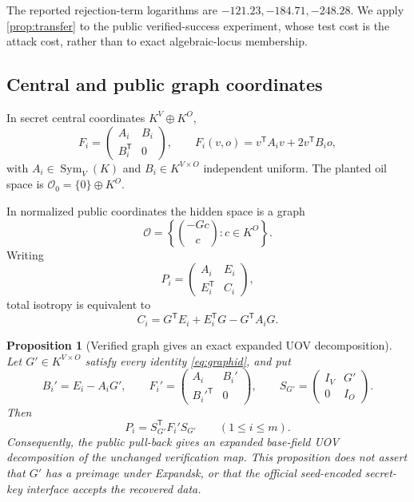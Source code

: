 \documentclass[10pt,a4paper]{article}
\newtheorem{proposition}[theorem]{Proposition}
\newcommand{\cO}{\mathcal O}
\newcommand{\Sym}{\operatorname{Sym}}
\newcommand{\trans}{\mathsf T}
\begin{document}
The reported rejection-term logarithms are $-121.23,-184.71,-248.28$. We apply \cref{prop:transfer} to the public verified-success experiment, whose test cost is the attack cost, rather than to exact algebraic-locus membership.

\subsection{Central and public graph coordinates}

In secret central coordinates $K^V\oplus K^O$,
\begin{equation}\label{eq:central}
F_i=\begin{pmatrix}A_i&B_i\\B_i^{\trans}&0\end{pmatrix},
\qquad F_i(v,o)=v^{\trans}A_iv+2v^{\trans}B_io,
\end{equation}
with $A_i\in\Sym_V(K)$ and $B_i\in K^{V\times O}$ independent uniform. The planted oil space is $\cO_0=\{0\}\oplus K^O$.

In normalized public coordinates the hidden space is a graph
\begin{equation}\label{eq:graph}
\cO=\left\{\binom{-Gc}{c}:c\in K^O\right\}.
\end{equation}
Writing
\[
P_i=\begin{pmatrix}A_i&E_i\\E_i^{\trans}&C_i\end{pmatrix},
\]
total isotropy is equivalent to
\begin{equation}\label{eq:graphid}
C_i=G^{\trans}E_i+E_i^{\trans}G-G^{\trans}A_iG.
\end{equation}

\begin{proposition}[Verified graph gives an exact expanded UOV decomposition]\label{prop:verified-key}
Let $G'\in K^{V\times O}$ satisfy every identity \eqref{eq:graphid}, and put
\[
B_i'=E_i-A_iG',\qquad
F_i'=\begin{pmatrix}A_i&B_i'\\ {B_i'}^{\trans}&0\end{pmatrix},\qquad
S_{G'}=\begin{pmatrix}I_V&G'\\0&I_O\end{pmatrix}.
\]
Then
\[
P_i=S_{G'}^{\trans}F_i'S_{G'}
\qquad(1\le i\le m).
\]
Consequently, the public pull-back gives an expanded base-field UOV decomposition of the unchanged verification map.  This proposition does not assert that $G'$ has a preimage under \textsf{Expandsk}, or that the official seed-encoded secret-key interface accepts the recovered data.
\end{proposition}
\end{document}

